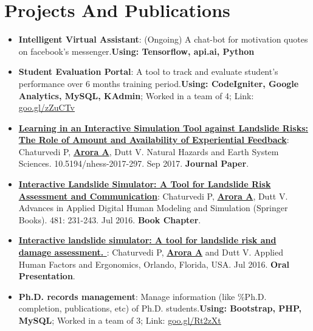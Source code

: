 \documentclass[letterpaper,11pt]{article}
\newcommand{\resumeItem}[2]{
  \item\small{
    \textbf{#1}{: #2 \vspace{-2pt}}
  }
}
\newcommand{\resumeSubItem}[2]{\resumeItem{#1}{#2}\vspace{-4pt}}
\newcommand{\resumeSubHeadingListStart}{\begin{itemize}[leftmargin=*]}
\newcommand{\resumeSubHeadingListEnd}{\end{itemize}}
\begin{document}
\section{Projects And Publications}
  \resumeSubHeadingListStart
  \resumeSubItem{Intelligent Virtual Assistant}
    {(Ongoing) A chat-bot for motivation quotes on facebook's messenger.\newline \textbf{Using: Tensorflow, api.ai, Python}}
    \resumeSubItem{Student Evaluation Portal}
      {A tool to track and evaluate student's performance over 6 months training period.\newline \textbf{Using: CodeIgniter, Google Analytics, MySQL, KAdmin}; Worked in a team of 4; Link: \href{https://goo.gl/zZuCTv}{goo.gl/zZuCTv} }
     \resumeSubItem{\href{https://www.researchgate.net/publication/319471329_Learning_in_an_Interactive_Simulation_Tool_against_Landslide_Risks_The_Role_of_Amount_and_Availability_of_Experiential_Feedback}{\textbf{Learning in an Interactive Simulation Tool against Landslide Risks: The Role of Amount and Availability of Experiential Feedback}}}
          {Chaturvedi P, \textbf{\underline{Arora A}}, Dutt V. Natural Hazards and Earth System Sciences. 10.5194/nhess-2017-297. Sep 2017. \textbf{Journal Paper}.}
    \resumeSubItem{\href{http://link.springer.com/chapter/10.1007/978-3-319-41627-4_21}{\textbf{Interactive Landslide Simulator: A Tool for Landslide Risk Assessment and Communication}}} {Chaturvedi P, \textbf{\underline{Arora A}}, Dutt V. Advances in Applied Digital Human Modeling and Simulation (Springer Books). 481: 231-243. Jul 2016. \textbf{Book Chapter}.}
    \resumeSubItem{\href{http://www.ahfe2016.org/}{\textbf{Interactive landslide simulator: A tool for landslide risk and damage assessment.} }}
    {Chaturvedi P, \textbf{\underline{Arora A}} and Dutt V. Applied Human Factors and Ergonomics, Orlando, Florida, USA. Jul 2016. \textbf{Oral Presentation}.}
    \resumeSubItem{Ph.D. records management}
      {Manage information (like \%Ph.D. completion, publications, etc) of Ph.D. students.\newline \textbf{Using: Bootstrap, PHP, MySQL}; Worked in a team of 3; Link: \href{https://goo.gl/Rt2zXt}{goo.gl/Rt2zXt}}
  \resumeSubHeadingListEnd
 
  
\end{document}
